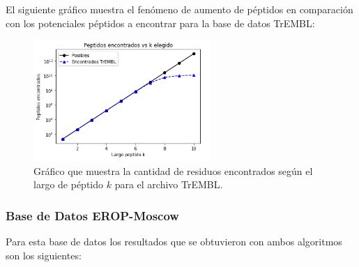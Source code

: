 El siguiente gráfico muestra el fenómeno de aumento de péptidos en comparación con los potenciales péptidos a encontrar para la base de datos TrEMBL:

\begin{figure}[h]
    \centering
    \includegraphics[width=0.6\textwidth]{./images/tremblv1.png}
    \caption{Gráfico que muestra la cantidad de residuos encontrados según el largo de péptido $k$ para el archivo TrEMBL.}
    \label{fig:trembl}
\end{figure}


\subsubsection{Base de Datos EROP-Moscow}

Para esta base de datos los resultados que se obtuvieron con ambos algoritmos son los siguientes:

